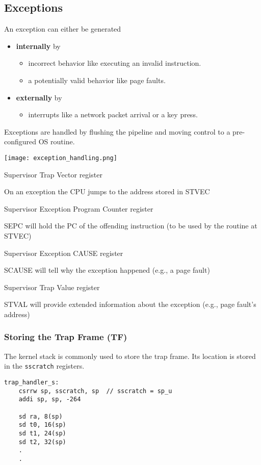 \subsection{Exceptions}\label{exceptions}
An exception can either be generated
\begin{itemize}
    \item \textbf{internally} by
          \begin{itemize}
              \item incorrect behavior like executing an invalid instruction.
              \item a potentially valid behavior like page faults.
          \end{itemize}
    \item \textbf{externally} by
          \begin{itemize}
              \item interrupts like a network packet arrival or a key press.
          \end{itemize}
\end{itemize}

Exceptions are handled by flushing the pipeline and moving control to a pre-configured OS routine.

\begin{center}
    \texttt{[image: exception\_handling.png]}
\end{center}

\newpar{}
 Supervisor Trap Vector register

On an exception the CPU jumps to the address stored in STVEC

\newpar{}
 Supervisor Exception Program Counter register

SEPC will hold the PC of the offending instruction (to be used by the routine at STVEC)

\newpar{}
 Supervisor Exception CAUSE register

SCAUSE will tell why the exception happened (e.g., a page fault)

\newpar{}
 Supervisor Trap Value register

STVAL will provide extended information about the exception (e.g., page fault's address)

\subsubsection{Storing the Trap Frame (TF)}

The kernel stack is commonly used to store the trap frame. Its location is stored in the \texttt{sscratch} registers.

\newpar{}

\begin{lstlisting}[language={[RISC-V]Assembler}]
trap_handler_s:
	csrrw sp, sscratch, sp  // sscratch = sp_u  
    addi sp, sp, -264
    
	sd ra, 8(sp)
	sd t0, 16(sp)
	sd t1, 24(sp)
	sd t2, 32(sp)
    .
    .
\end{lstlisting}